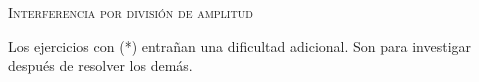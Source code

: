 \documentclass[11pt, spanish, a4paper, twoside]{article}
\begin{document}
\begin{center}
	\textsc{\LARGE Interferencia por división de amplitud}
\end{center}

Los ejercicios con (*) entrañan una dificultad adicional. Son para investigar después de resolver los demás.


\begin{enumerate}






\end{enumerate}
\end{document}
